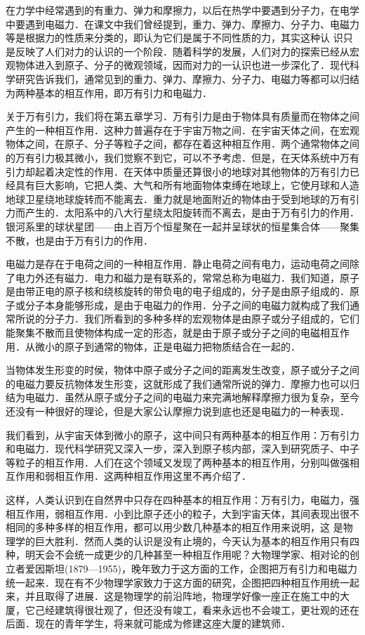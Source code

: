 \begin{Information}
在力学中经常遇到的有重力、弹力和摩擦力，以后在热学中要遇到分子力，在电学中要遇到电磁力．在课文中我们曾经提到，重力、弹力、摩擦力、分子力、电磁力等是根据力的性质来分类的，即认为它们是属于不同性质的力，其实这种认
识只是反映了人们对力的认识的一个阶段．随着科学的发展，人们对力的探索已经从宏观物体进入到原子、分子的微观领域，因而对力的一认识也进一步深化了．现代科学研究告诉我们，通常见到的重力、弹力、摩擦力、分子力、电磁力等都可以归结为两种基本的相互作用，即万有引力和电磁力．

关于万有引力，我们将在第五章学习．万有引力是由于物体具有质量而在物体之间产生的一种相互作用．这种力普遍存在于宇宙万物之间．在宇宙天体之间，在宏观物体之间，在原子、分子等粒子之间，都存在着这种相互作用．两个通常物体之间的万有引力极其微小，我们觉察不到它，可以不予考虑．但是，在天体系统中万有引力却起着决定性的作用．在天体中质量还算很小的地球对其他物体的万有引力已经具有巨大影响，它把人类、大气和所有地面物体束缚在地球上，它使月球和人造地球卫星绕地球旋转而不能离去．重力就是地面附近的物体由于受到地球的万有引力而产生的．太阳系中的八大行星绕太阳旋转而不离去，是由于万有引力的作用．银河系里的球状星团——由上百万个恒星聚在一起并呈球状的恒星集合体——聚集不散，也是由于万有引力的作用．

电磁力是存在于电荷之间的一种相互作用．静止电荷之间有电力，运动电荷之间除了电力外还有磁力．电力和磁力是有联系的，常常总称为电磁力．我们知道，原子是由带正电的原子核和绕核旋转的带负电的电子组成的，分子是由原子组成的．原子或分子本身能够形成，是由于电磁力的作用．分子之间的电磁力就构成了我们通常所说的分子力．我们所看到的多种多样的宏观物体是由原子或分子组成的，它们能聚集不散而且使物体构成一定的形态，就是由于原子或分子之间的电磁相互作用．从微小的原子到通常的物体，正是电磁力把物质结合在一起的．

当物体发生形变的时侯，物体中原子或分子之间的距离发生改变，原子或分子之间的电磁力要反抗物体发生形变，这就形成了我们通常所说的弹力．摩擦力也可以归结为电磁力．虽然从原子或分子之间的电磁力来完满地解释摩擦力很为复杂，至今还没有一种很好的理论，但是大家公认摩擦力说到底也还是电磁力的一种表现．

我们看到，从宇宙天体到微小的原子，这中间只有两种基本的相互作用：万有引力和电磁力．现代科学研究又深入一步，深入到原子核内部，深入到研究质子、中子等粒子的相互作用．人们在这个领域又发现了两种基本的相互作用，分别叫做强相互作用和弱相互作用．这两种相互作用这里不再介绍了．

这样，人类认识到在自然界中只存在四种基本的相互作用：万有引力，电磁力，强相互作用，弱相互作用．小到比原子还小的粒子，大到宇宙天体，其间表现出很不相同的多种多样的相互作用，都可以用少数几种基本的相互作用来说明，这
是物理学的巨大胜利．然而人类的认识是没有止境的，今天认为基本的相互作用只有四种，明天会不会统一成更少的几种甚至一种相互作用呢？大物理学家、相对论的创立者爱因斯坦(1879—1955)，晚年致力于这方面的工作，企图把万有引力和电磁力统一起来．现在有不少物理学家致力于这方面的研究，企图把四种相互作用统一起来，并且取得了进展．这是物理学的前沿阵地，物理学好像一座正在施工中的大厦，它己经建筑得很壮观了，但还没有竣工，看来永远也不会竣工，更壮观的还在后面．现在的青年学生，将来就可能成为修建这座大厦的建筑师．
\end{Information}


